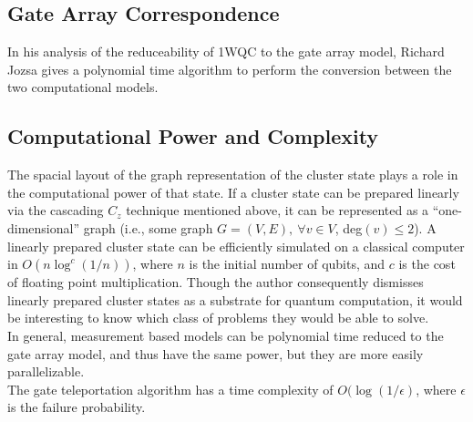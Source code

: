 \documentclass[twocolumn]{IEEEtran11}
\begin{document}
\subsection{Gate Array Correspondence}
In his analysis of the reduceability of 1WQC to the gate array model, Richard Jozsa gives a polynomial time algorithm to perform the conversion between the two computational models\cite{jozsa2006introduction}. 

\subsection{Computational Power and Complexity}
The spacial layout of the graph representation of the cluster state plays a role in the computational power of that state. If a cluster state can be prepared linearly via the cascading $C_z$ technique mentioned above, it can be represented as a  ``one-dimensional'' graph (i.e., some graph $G=(V,E),\ \forall v\in V$, deg$(v)\leq 2$). A linearly prepared cluster state can be efficiently simulated on a classical computer in $O(n\log ^c (1/n))$, where $n$ is the initial number of qubits, and $c$ is the cost of floating point multiplication\cite{nielsen2006cluster}. Though the author consequently dismisses linearly prepared cluster states as a substrate for quantum computation, it would be interesting to know which class of problems they would be able to solve. \\
In general, measurement based models can be polynomial time reduced to the gate array model, and thus have the same power, but they are more easily parallelizable\cite{jozsa2006introduction}.\\
The gate teleportation algorithm\cite{nielsen108020universal} has a time complexity of $O(\log (1/\epsilon)$, where $\epsilon$ is the failure probability. 



\end{document}
